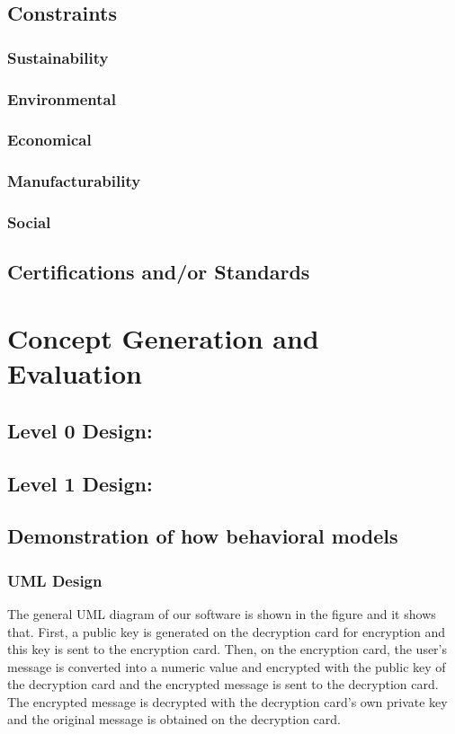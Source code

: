 \documentclass[12pt]{article}
\begin{document}
	\subsection{Constraints}
		\subsubsection{Sustainability}
		\subsubsection{Environmental}
		\subsubsection{Economical}
		\subsubsection{Manufacturability}
		\subsubsection{Social}
	\subsection{Certifications and/or Standards}
	
	\section{Concept Generation and Evaluation}
	
	\subsection{Level 0 Design:}
	
	\subsection{Level 1 Design:}
	
	\subsection{Demonstration of how behavioral models}
	\subsubsection{UML Design}
 	The general UML diagram of our software is shown in the figure and it shows that. First, a public key is generated on the decryption card for encryption and this key is sent to the encryption card. Then, on the encryption card, the user's message is converted into a numeric value and encrypted with the public key of the decryption card and the encrypted message is sent to the decryption card. The encrypted message is decrypted with the decryption card's own private key and the original message is obtained on the decryption card.
\end{document}
